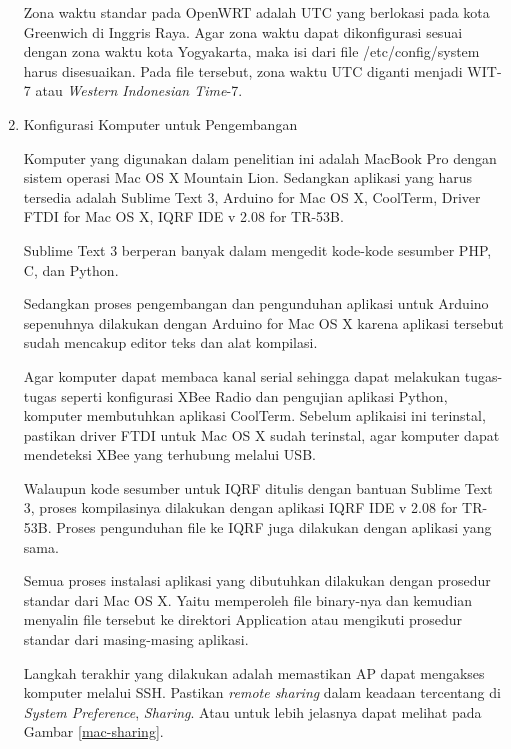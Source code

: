 \begin{enumerate}
					Zona waktu standar pada OpenWRT adalah UTC yang berlokasi pada kota Greenwich di Inggris Raya. Agar zona waktu dapat dikonfigurasi sesuai dengan zona waktu kota Yogyakarta, maka isi dari file /etc/config/system harus disesuaikan. Pada file tersebut, zona waktu UTC diganti menjadi WIT-7 atau \emph{Western Indonesian Time}-7.

				\item Konfigurasi Komputer untuk Pengembangan

					Komputer yang digunakan dalam penelitian ini adalah MacBook Pro dengan sistem operasi Mac OS X Mountain Lion. Sedangkan aplikasi yang harus tersedia adalah Sublime Text 3, Arduino for Mac OS X, CoolTerm, Driver FTDI for Mac OS X, IQRF IDE v 2.08 for TR-53B.

					Sublime Text 3 berperan banyak dalam mengedit kode-kode sesumber PHP, C, dan Python.

					Sedangkan proses pengembangan dan pengunduhan aplikasi untuk Arduino sepenuhnya dilakukan dengan Arduino for Mac OS X karena aplikasi tersebut sudah mencakup editor teks dan alat kompilasi.

					Agar komputer dapat membaca kanal serial sehingga dapat melakukan tugas-tugas seperti konfigurasi XBee Radio dan pengujian aplikasi Python, komputer membutuhkan aplikasi CoolTerm. Sebelum aplikaisi ini terinstal, pastikan driver FTDI untuk Mac OS X sudah terinstal, agar komputer dapat mendeteksi XBee yang terhubung melalui USB.

					Walaupun kode sesumber untuk IQRF ditulis dengan bantuan Sublime Text 3, proses kompilasinya dilakukan dengan aplikasi IQRF IDE v 2.08 for TR-53B. Proses pengunduhan file ke IQRF juga dilakukan dengan aplikasi yang sama.

					Semua proses instalasi aplikasi yang dibutuhkan dilakukan dengan prosedur standar dari Mac OS X. Yaitu memperoleh file binary-nya dan kemudian menyalin file tersebut ke direktori Application atau mengikuti prosedur standar dari masing-masing aplikasi.

					Langkah terakhir yang dilakukan adalah memastikan AP dapat mengakses komputer melalui SSH. Pastikan \emph{remote sharing} dalam keadaan tercentang di \emph{System Preference}, \emph{Sharing}. Atau untuk lebih jelasnya dapat melihat pada Gambar \ref{mac-sharing}.


\end{enumerate}
